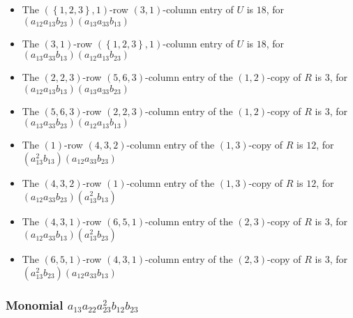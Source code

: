 \documentclass{article}
\begin{document}
\begin{itemize}
\item The $ \left(\left\{1, 2, 3\right\}, 1\right) $-row $ \left(3, 1\right) $-column entry of $U$ is $ 18 $, for $( a_{12} a_{13} b_{23} )( a_{13} a_{33} b_{13} )$ 
\item The $ \left(3, 1\right) $-row $ \left(\left\{1, 2, 3\right\}, 1\right) $-column entry of $U$ is $ 18 $, for $( a_{13} a_{33} b_{13} )( a_{12} a_{13} b_{23} )$ 
\item The $(2, 2, 3)$-row $(5, 6, 3)$-column entry of the $ \left(1, 2\right) $-copy of $R$ is $ 3 $, for $( a_{12} a_{13} b_{13} )( a_{13} a_{33} b_{23} )$ 
\item The $(5, 6, 3)$-row $(2, 2, 3)$-column entry of the $ \left(1, 2\right) $-copy of $R$ is $ 3 $, for $( a_{13} a_{33} b_{23} )( a_{12} a_{13} b_{13} )$ 
\item The $(1)$-row $(4, 3, 2)$-column entry of the $ \left(1, 3\right) $-copy of $R$ is $ 12 $, for $( a_{13}^{2} b_{13} )( a_{12} a_{33} b_{23} )$ 
\item The $(4, 3, 2)$-row $(1)$-column entry of the $ \left(1, 3\right) $-copy of $R$ is $ 12 $, for $( a_{12} a_{33} b_{23} )( a_{13}^{2} b_{13} )$ 
\item The $(4, 3, 1)$-row $(6, 5, 1)$-column entry of the $ \left(2, 3\right) $-copy of $R$ is $ 3 $, for $( a_{12} a_{33} b_{13} )( a_{13}^{2} b_{23} )$ 
\item The $(6, 5, 1)$-row $(4, 3, 1)$-column entry of the $ \left(2, 3\right) $-copy of $R$ is $ 3 $, for $( a_{13}^{2} b_{23} )( a_{12} a_{33} b_{13} )$ 
\end{itemize}
\subsubsection{Monomial $ a_{13} a_{22} a_{23}^{2} b_{12} b_{23} $}
\end{document}
